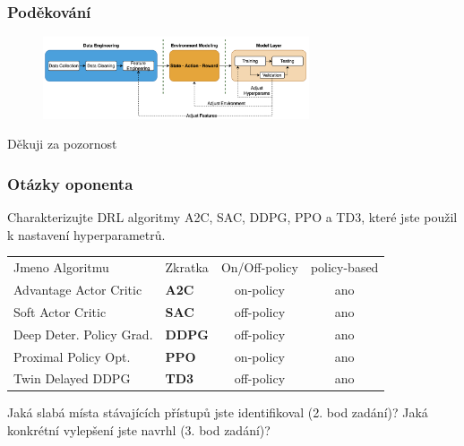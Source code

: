 \begin{frame}
    \frametitle{Poděkování}
    \begin{center}
        \begin{figure}
            \centering
            \includegraphics[width=0.7\textwidth]{img/navrh_reseni}
        \end{figure}
        \vspace{0.5cm}
        \Huge Děkuji za pozornost
    \end{center}
\end{frame}

\begin{frame}
    \frametitle{Otázky oponenta}
    \large{Charakterizujte DRL algoritmy A2C, SAC, DDPG, PPO a TD3, které jste použil k nastavení hyperparametrů.}

    \begin{table}
        \centering
        {\footnotesize
            \begin{tabular}{llcc}
                Jmeno Algoritmu          & Zkratka       & On/Off-policy & policy-based \\

                Advantage Actor Critic   & \textbf{A2C}  & on-policy     & ano          \\
                Soft Actor Critic        & \textbf{SAC}  & off-policy    & ano          \\
                Deep Deter. Policy Grad. & \textbf{DDPG} & off-policy    & ano          \\
                Proximal Policy Opt.     & \textbf{PPO}  & on-policy     & ano          \\
                Twin Delayed DDPG        & \textbf{TD3}  & off-policy    & ano          \\
            \end{tabular}
        }
        \label{tab:algo}
    \end{table}

    \vfill

    \large{Jaká slabá místa stávajících přístupů jste identifikoval (2. bod zadání)? Jaká konkrétní vylepšení jste navrhl (3. bod zadání)?}
\end{frame}

